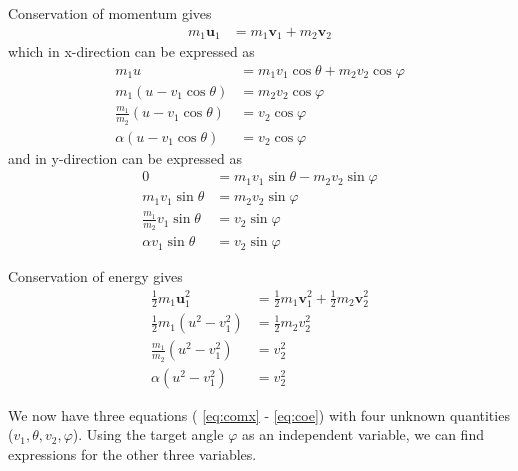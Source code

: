 \documentclass[twoside,english]{uiofysmaster/uiofysmaster}
\let\orgautoref\autoref
\renewcommand{\autoref}
        {\def\equationautorefname{Eq.}%
         \def\figureautorefname{Fig.}%
         \def\subfigureautorefname{Fig.}%
         \def\sectionautorefname{Sec.}%
         \def\subsectionautorefname{Sec.}%
         \def\subsubsectionautorefname{Sec.}%
         \def\Itemautorefname{item}%
         \def\tableautorefname{Tab.}%
         \orgautoref}
\begin{document}
\begin{appendices}
Conservation of momentum gives
\begin{align*}%
	m_1 \boldsymbol{u}_1 &= m_1 \boldsymbol{v}_1 + m_2 \boldsymbol{v}_2
\end{align*}
which in x-direction can be expressed as
\begin{align}\label{eq:comx}
	m_1 u &= m_1 v_1 \cos \theta + m_2 v_2 \cos \varphi  \nonumber\\
	m_1 (u - v_1 \cos \theta) &= m_2 v_2 \cos \varphi  \nonumber\\
	\frac{m_1}{m_2} (u - v_1 \cos \theta) &= v_2 \cos \varphi  \nonumber\\
	\alpha (u - v_1 \cos \theta) &= v_2 \cos \varphi
\end{align}
and in y-direction can be expressed as
\begin{align}\label{eq:comy}
	0 &= m_1 v_1 \sin \theta - m_2 v_2 \sin \varphi \nonumber\\
	m_1 v_1 \sin \theta &= m_2 v_2 \sin \varphi \nonumber\\
	\frac{m_1}{m_2} v_1 \sin \theta &= v_2 \sin \varphi \nonumber\\
	\alpha v_1 \sin \theta &= v_2 \sin \varphi
\end{align}

Conservation of energy gives
\begin{align}\label{eq:coe}
	\tfrac{1}{2} m_1 \boldsymbol{u}_1^2 &= \tfrac{1}{2} m_1 \boldsymbol{v}_1^2 + \tfrac{1}{2} m_2 \boldsymbol{v}_2^2 \nonumber\\
	\tfrac{1}{2} m_1 (u^2 - v_1^2) &= \tfrac{1}{2} m_2 v_2^2 \nonumber\\
	\frac{m_1}{m_2} (u^2 - v_1^2) &= v_2^2 \nonumber\\
	\alpha (u^2 - v_1^2) &= v_2^2
\end{align}

We now have three equations (\autoref{eq:comx} - \autoref{eq:coe}) with four unknown quantities ($v_1, \theta, v_2, \varphi$). Using the target angle $\varphi$ as an independent variable, we can find expressions for the other three variables. 


\end{appendices}
\end{document}
